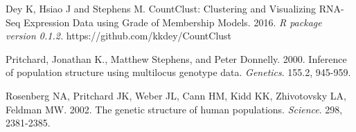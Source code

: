 \documentclass[12pt]{article}\usepackage[]{graphicx}\usepackage[usenames,dvipsnames]{color}
\begin{document}
\begin{thebibliography}

Dey K, Hsiao J and Stephens M.
CountClust: Clustering and Visualizing RNA-Seq Expression Data using Grade of Membership Models. 2016.
\textit{R package version 0.1.2.} https://github.com/kkdey/CountClust

Pritchard, Jonathan K., Matthew Stephens, and Peter Donnelly. 2000.
Inference of population structure using multilocus genotype data.
\textit{Genetics}. 155.2,  945-959.

Rosenberg NA, Pritchard JK,  Weber JL, Cann HM,  Kidd KK,  Zhivotovsky LA,  Feldman MW. 2002.
The genetic structure of human populations.
\textit{Science}. 298,  2381-2385.







\end{thebibliography}
\end{document}
